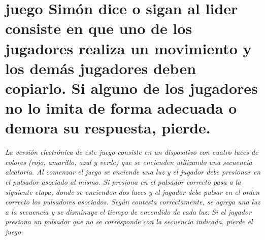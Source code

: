 \hypertarget{index_El}{}\section{juego Simón dice o sigan al lider consiste en que uno de los jugadores realiza un movimiento y los demás jugadores deben copiarlo. Si alguno de los jugadores no lo imita de forma adecuada o demora su respuesta, pierde.}\label{index_El}
{\itshape  La versión electrónica de este juego consiste en un dispositivo con cuatro luces de colores (rojo, amarillo, azul y verde) que se encienden utilizando una secuencia aleatoria. Al comenzar el juego se enciende una luz y el jugador debe presionar en el pulsador asociado al mismo. Si presiona en el pulsador correcto pasa a la siguiente etapa, donde se encienden dos luces y el jugador debe pulsar en el orden correcto los pulsadores asociados. Según contesta correctamente, se agrega una luz a la secuencia y se disminuye el tiempo de encendido de cada luz. Si el jugador presiona un pulsador que no se corresponde con la secuencia indicada, pierde el juego. } 